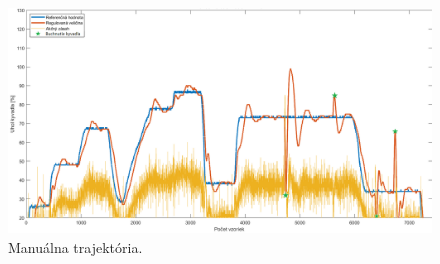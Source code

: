 \begin{figure}[!tbh]
	\centering
	\includegraphics[width=125mm]{obr/SimulinkManualBuch.png}
	\caption{Manuálna trajektória.}\label{OBRAZOK 2.6.12}
\end{figure}